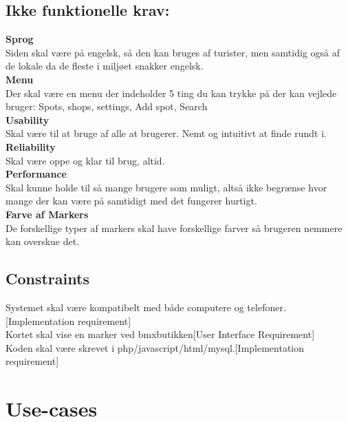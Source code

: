 \documentclass[12pt]{article}
\begin{document}
\subsection*{Ikke funktionelle krav:}
\textbf{Sprog}\\ Siden skal være på engelsk, så den kan bruges af turister, men samtidig også af de lokale da de fleste i miljøet snakker engelsk.\\
\textbf{Menu}\\ Der skal være en menu der indeholder 5 ting du kan trykke på der kan vejlede bruger: Spots, shops, settings, Add spot, Search\\
\textbf{Usability}\\ Skal være til at bruge af alle at brugerer. Nemt og intuitivt at finde rundt i.
\textbf{Reliability}\\ Skal være oppe og klar til brug, altid.\\
\textbf{Performance}\\ Skal kunne holde til så mange brugere som muligt, altså ikke begrænse hvor mange der kan være på samtidigt med det fungerer hurtigt. \\
\textbf{Farve af Markers}\\ De forskellige typer af markers skal have forskellige farver så brugeren nemmere kan overskue det.
\subsection*{Constraints}
Systemet skal være kompatibelt med både computere og telefoner.[Implementation requirement]\\
Kortet skal vise en marker ved bmxbutikken[User Interface Requirement]\\
Koden skal være skrevet i php/javascript/html/mysql.[Implementation requirement]\\

\pagebreak
\section*{Use-cases}
\end{document}
